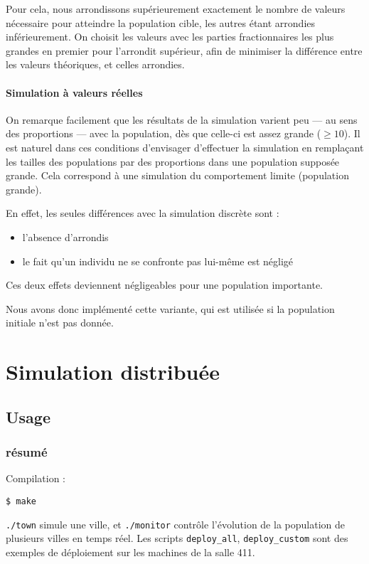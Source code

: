 \documentclass[draft,10pt]{article}
\begin{document}
Pour cela, nous arrondissons supérieurement exactement le nombre de valeurs nécessaire pour atteindre
la population cible, les autres étant arrondies inférieurement. 
On choisit les valeurs avec les parties fractionnaires les plus grandes en premier pour l'arrondit supérieur,
afin de minimiser la différence entre les valeurs théoriques, et celles arrondies.

\paragraph{Simulation à valeurs réelles}
On remarque facilement que les résultats de la simulation varient peu --- au sens des proportions --- avec la population, dès que celle-ci
est assez grande ($\ge 10$).
Il est naturel dans ces conditions d'envisager d'effectuer la simulation en remplaçant les tailles des populations
par des proportions dans une population supposée grande. Cela correspond à une simulation du comportement limite (population grande).

En effet, les seules différences avec la simulation discrète sont :
\begin{itemize}
\item l'absence d'arrondis
\item le fait qu'un individu ne se confronte pas lui-même est négligé
\end{itemize}
Ces deux effets deviennent négligeables pour une population importante.

Nous avons donc implémenté cette variante, qui est utilisée si la population initiale n'est pas donnée.

\newpage
\section{Simulation distribuée}
\subsection{Usage}
\subsubsection*{résumé}
Compilation :
\begin{verbatim}
$ make
\end{verbatim}

\verb|./town| simule une ville, et \verb|./monitor| contrôle l'évolution de la population de plusieurs villes en temps réel.
Les scripts \verb|deploy_all|, \verb|deploy_custom| sont des exemples de déploiement sur les machines de la salle 411.
\end{document}
